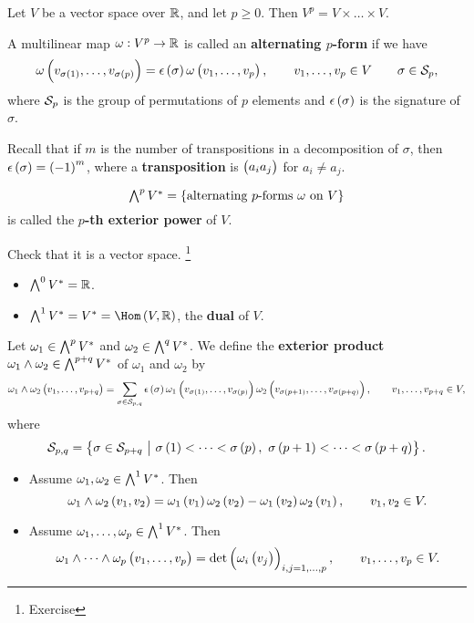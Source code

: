 Let $ V $ be a vector space over $ \mathbb{R} $, and let $ p \ge 0 $. Then $ V^p = V \times \dots \times V $.

\begin{definition}
A multilinear map $ \omega : V^p \to \mathbb{R} $ is called an \textbf{alternating $ p $-form} if we have
$$ \omega\br{v_{\sigma\br{1}}, \dots, v_{\sigma\br{p}}} = \epsilon\br{\sigma}\omega\br{v_1, \dots, v_p}, \qquad v_1, \dots, v_p \in V \qquad \sigma \in \SSS_p, $$
where $ \mathcal{S}_p $ is the group of permutations of $ p $ elements and $ \epsilon\br{\sigma} $ is the signature of $ \sigma $.
\end{definition}

Recall that if $ m $ is the number of transpositions in a decomposition of $ \sigma $, then $ \epsilon\br{\sigma} = \br{-1}^m $, where a \textbf{transposition} is $ \br{a_ia_j} $ for $ a_i \ne a_j $.

\begin{notation}
$$ \ext^pV^* = \cbr{\text{alternating $ p $-forms} \ \omega \ \text{on} \ V} $$
is called the \textbf{$ p $-th exterior power} of $ V $.
\end{notation}

Check that it is a vector space. \footnote{Exercise}

\begin{example}
\hfill
\begin{itemize}
\item $ \textstyle\bigwedge^0V^* = \mathbb{R} $.
\item $ \ext^1V^* = V^* = \Hom\br{V, \RR} $, the \textbf{dual} of $ V $.
\end{itemize}
\end{example}

\begin{definition}
Let $ \omega_1 \in \textstyle\bigwedge^pV^* $ and $ \omega_2 \in \textstyle\bigwedge^qV^* $. We define the \textbf{exterior product} $ \omega_1 \wedge \omega_2 \in \textstyle\bigwedge^{p + q}V^* $ of $ \omega_1 $ and $ \omega_2 $ by
$$ \omega_1 \wedge \omega_2\br{v_1, \dots, v_{p + q}} = \sum_{\sigma \in \SSS_{p, q}} \epsilon\br{\sigma}\omega_1\br{v_{\sigma\br{1}}, \dots, v_{\sigma\br{p}}}\omega_2\br{v_{\sigma\br{p + 1}}, \dots, v_{\sigma\br{p + q}}}, \qquad v_1, \dots, v_{p + q} \in V, $$
where
$$ \SSS_{p, q} = \cbr{\sigma \in \SSS_{p + q} \st \sigma\br{1} < \dots < \sigma\br{p}, \ \sigma\br{p + 1} < \dots < \sigma\br{p + q}}. $$
\end{definition}

\begin{example}
\hfill
\begin{itemize}
\item Assume $ \omega_1, \omega_2 \in \textstyle\bigwedge^1V^* $. Then
$$ \omega_1 \wedge \omega_2\br{v_1, v_2} = \omega_1\br{v_1}\omega_2\br{v_2} - \omega_1\br{v_2}\omega_2\br{v_1}, \qquad v_1, v_2 \in V. $$
\item Assume $ \omega_1, \dots, \omega_p \in \textstyle\bigwedge^1V^* $. Then
$$ \omega_1 \wedge \dots \wedge \omega_p\br{v_1, \dots, v_p} = \det \br{\omega_i\br{v_j}}_{i, j = 1, \dots, p}, \qquad v_1, \dots, v_p \in V. $$
\end{itemize}
\end{example}

